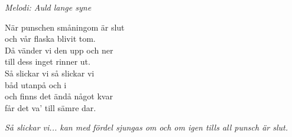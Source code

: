 {\footnotesize\textit{Melodi: Auld lange syne}}\par
\vspace{10pt}
När punschen småningom är slut\\
och vår flaska blivit tom.\\
Då vänder vi den upp och ner\\
till dess inget rinner ut.\\
\revrpt Så slickar vi så slickar vi\\
båd utanpå och i\\
och finns det ändå något kvar\\
får det va' till sämre dar.\rpt\par
\vspace{10pt}
{\footnotesize\textit{Så slickar vi... kan med fördel sjungas om och om igen tills all punsch är slut.}}
